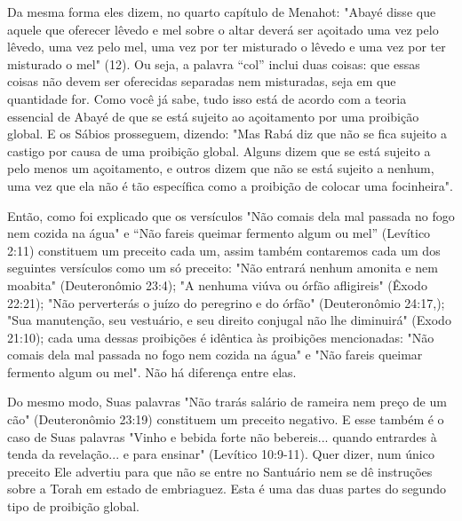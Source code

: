 Da mesma forma eles dizem, no quarto capítulo de Menahot: "Aba­yé disse
que aquele que oferecer lêvedo e mel sobre o altar deverá ser açoitado
uma vez pelo lêvedo, uma vez pelo mel, uma vez por ter misturado o
lêvedo e uma vez por ter misturado o mel" (12). Ou seja, a palavra ``col''
inclui duas coisas: que essas coisas não devem ser oferecidas separadas
nem misturadas, seja em que quantidade for. Como você já sabe, tudo isso
está de acordo com a teoria essencial de Abayé de que se está sujeito ao
açoitamento por uma proi­bição global. E os Sábios prosseguem, dizendo:
"Mas Rabá diz que não se fica sujeito a castigo por causa de uma
proibição global. Alguns dizem que se está sujeito a pelo menos um
açoitamento, e outros dizem que não se está sujeito a nenhum, uma vez
que ela não é tão específica como a proibição de colocar uma
focinheira".

Então, como foi explicado que os versículos "Não comais dela mal passada
no fogo nem cozida na água" e ``Não fareis queimar fermento algum ou mel''
(Levítico 2:11) constituem um preceito cada um, assim também conta­remos
cada um dos seguintes versículos como um só preceito: "Não entrará
nenhum amonita e nem moabita" (Deuteronômio 23:4); "A nenhuma viúva ou
órfão afligireis" (Êxodo 22:21); "Não perverterás o juízo do peregrino e
do ór­fão" (Deuteronômio 24:17,); "Sua manutenção, seu vestuário, e seu
direito con­jugal não lhe diminuirá" (Exodo 21:10); cada uma dessas
proibições é idêntica às proibições mencionadas: "Não comais dela mal
passada no fogo nem cozida na água" e "Não fareis queimar fermento algum
ou mel". Não há diferença en­tre elas.

Do mesmo modo, Suas palavras "Não trarás salário de rameira nem preço de
um cão" (Deuteronômio 23:19) constituem um preceito negativo. E esse
também é o caso de Suas palavras "Vinho e bebida forte não bebereis...
quando entrardes à tenda da revelação... e para ensinar" (Levítico
10:9-11). Quer dizer, num único preceito Ele advertiu para que não se
entre no Santuário nem se dê instruções sobre a Torah em estado de
embriaguez. Esta é uma das duas partes do segundo tipo de proibição
global.

